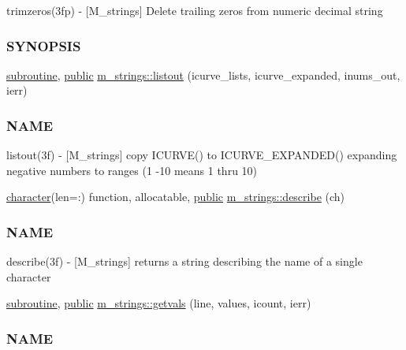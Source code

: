 \begin{DoxyCompactItemize}
\begin{DoxyCompactList}
trimzeros(3fp) -\/ \mbox{[}M\+\_\+strings\mbox{]} Delete trailing zeros from numeric decimal string \subsubsection*{S\+Y\+N\+O\+P\+S\+IS}\end{DoxyCompactList}\item 
\hyperlink{M__stopwatch_83_8txt_acfbcff50169d691ff02d4a123ed70482}{subroutine}, \hyperlink{M__stopwatch_83_8txt_a2f74811300c361e53b430611a7d1769f}{public} \hyperlink{namespacem__strings_a81b4b7f4f301b9e17604adbcace58d0c}{m\+\_\+strings\+::listout} (icurve\+\_\+lists, icurve\+\_\+expanded, inums\+\_\+out, ierr)
\begin{DoxyCompactList}\small\item\em \subsubsection*{N\+A\+ME}

listout(3f) -\/ \mbox{[}M\+\_\+strings\mbox{]} copy I\+C\+U\+R\+V\+E() to I\+C\+U\+R\+V\+E\+\_\+\+E\+X\+P\+A\+N\+D\+E\+D() expanding negative numbers to ranges (1 -\/10 means 1 thru 10) \end{DoxyCompactList}\item 
\hyperlink{option__stopwatch_83_8txt_abd4b21fbbd175834027b5224bfe97e66}{character}(len=\+:) function, allocatable, \hyperlink{M__stopwatch_83_8txt_a2f74811300c361e53b430611a7d1769f}{public} \hyperlink{namespacem__strings_a8d7007f0c34d7db4c004dac56e609b3f}{m\+\_\+strings\+::describe} (ch)
\begin{DoxyCompactList}\small\item\em \subsubsection*{N\+A\+ME}

describe(3f) -\/ \mbox{[}M\+\_\+strings\mbox{]} returns a string describing the name of a single character \end{DoxyCompactList}\item 
\hyperlink{M__stopwatch_83_8txt_acfbcff50169d691ff02d4a123ed70482}{subroutine}, \hyperlink{M__stopwatch_83_8txt_a2f74811300c361e53b430611a7d1769f}{public} \hyperlink{namespacem__strings_abf6c760f5d15a306bd252337d0a5ba4d}{m\+\_\+strings\+::getvals} (line, values, icount, ierr)
\begin{DoxyCompactList}\small\item\em \subsubsection*{N\+A\+ME}


\end{DoxyCompactList}
\end{DoxyCompactItemize}
